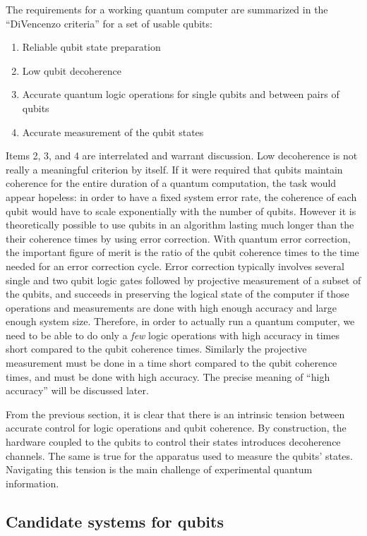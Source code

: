 The requirements for a working quantum computer are summarized in the ``DiVencenzo criteria'' for a set of usable qubits:
\begin{enumerate}
\item Reliable qubit state preparation
\item Low qubit decoherence
\item Accurate quantum logic operations for single qubits and between pairs of qubits
\item Accurate measurement of the qubit states
\end{enumerate}
Items 2, 3, and 4 are interrelated and warrant discussion.
Low decoherence is not really a meaningful criterion by itself.
If it were required that qubits maintain coherence for the entire duration of a quantum computation, the task would appear hopeless: in order to have a fixed system error rate, the coherence of each qubit would have to scale exponentially with the number of qubits.
However it is theoretically possible to use qubits in an algorithm lasting much longer than the their coherence times by using error correction.
With quantum error correction, the important figure of merit is the ratio of the qubit coherence times to the time needed for an error correction cycle.
Error correction typically involves several single and two qubit logic gates followed by projective measurement of a subset of the qubits, and succeeds in preserving the logical state of the computer if those operations and measurements are done with high enough accuracy and large enough system size.
Therefore, in order to actually run a quantum computer, we need to be able to do only a \emph{few} logic operations with high accuracy in times short compared to the qubit coherence times.
Similarly the projective measurement must be done in a time short compared to the qubit coherence times, and must be done with high accuracy.
The precise meaning of ``high accuracy'' will be discussed later.

From the previous section, it is clear that there is an intrinsic tension between accurate control for logic operations and qubit coherence.
By construction, the hardware coupled to the qubits to control their states introduces decoherence channels.
The same is true for the apparatus used to measure the qubits' states.
Navigating this tension is the main challenge of experimental quantum information.

\subsection{Candidate systems for qubits}

